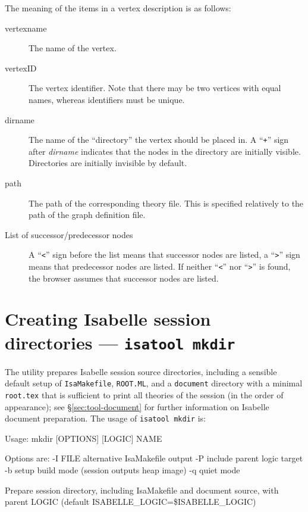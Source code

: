 The meaning of the items in a vertex description is as follows:
\begin{description}
  
\item[vertexname] The name of the vertex.
  
\item[vertexID] The vertex identifier. Note that there may be two
  vertices with equal names, whereas identifiers must be unique.
  
\item[dirname] The name of the ``directory'' the vertex should be
  placed in.  A ``{\tt +}'' sign after {\it dirname} indicates that
  the nodes in the directory are initially visible. Directories are
  initially invisible by default.
  
\item[path] The path of the corresponding theory file. This is
  specified relatively to the path of the graph definition file.
  
\item[List of successor/predecessor nodes] A ``{\tt <}'' sign before
  the list means that successor nodes are listed, a ``{\tt >}'' sign
  means that predecessor nodes are listed. If neither ``{\tt <}'' nor
  ``{\tt >}'' is found, the browser assumes that successor nodes are
  listed.

\end{description}


\section{Creating Isabelle session directories --- \texttt{isatool mkdir}}
\label{sec:tool-mkdir}

The  utility prepares Isabelle session source directories,
including a sensible default setup of \texttt{IsaMakefile}, \texttt{ROOT.ML},
and a \texttt{document} directory with a minimal \texttt{root.tex} that is
sufficient to print all theories of the session (in the order of appearance);
see \S\ref{sec:tool-document} for further information on Isabelle document
preparation.  The usage of \texttt{isatool mkdir} is:
\begin{ttbox}
Usage: mkdir [OPTIONS] [LOGIC] NAME

  Options are:
    -I FILE      alternative IsaMakefile output
    -P           include parent logic target
    -b           setup build mode (session outputs heap image)
    -q           quiet mode

  Prepare session directory, including IsaMakefile and document source,
  with parent LOGIC (default ISABELLE_LOGIC=\$ISABELLE_LOGIC)
\end{ttbox}

